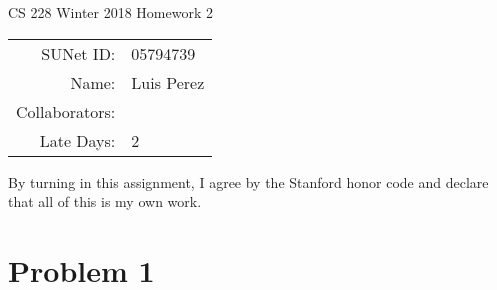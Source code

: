 \documentclass[12pt]{article}
\begin{document}
\begin{center}
{\Large CS 228 Winter 2018 Homework 2}

\begin{tabular}{rl}
SUNet ID: & 05794739 \\
Name: & Luis Perez \\
Collaborators: & \\
Late Days: & 2
\end{tabular}
\end{center}

By turning in this assignment, I agree by the Stanford honor code and declare
that all of this is my own work.

\section*{Problem 1}
\end{document}
